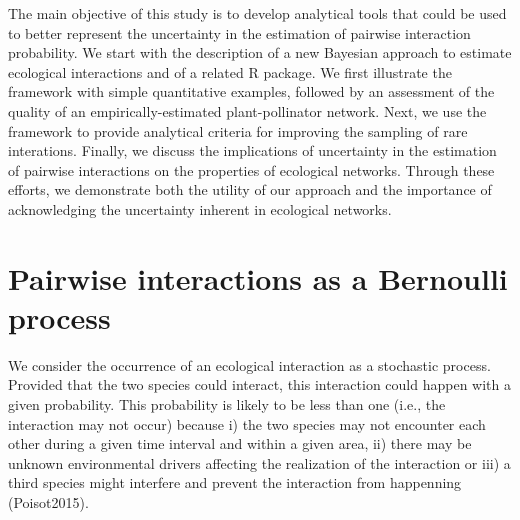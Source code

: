 \documentclass[12pt]{article}
\begin{document}
    The main objective of this study is to develop analytical tools that could be used to better represent the uncertainty in the estimation of pairwise interaction probability. We start with the description of a new Bayesian approach to estimate ecological interactions and of a related R package. We first illustrate the framework with simple quantitative examples, followed by an assessment of the quality of an empirically-estimated plant-pollinator network. Next, we use the framework to provide analytical criteria for improving the sampling of rare interations. Finally, we discuss the implications of uncertainty in the estimation of pairwise interactions on the properties of ecological networks. Through these efforts, we demonstrate both the utility of our approach and the importance of acknowledging the uncertainty inherent in ecological networks.






\section*{Pairwise interactions as a Bernoulli process}

    We consider the occurrence of an ecological interaction as a stochastic process. Provided that the two species could interact, this interaction could happen with a given probability. This probability is likely to be less than one (i.e., the interaction may not occur) because i) the two species may not encounter each other during a given time interval and within a given area, ii) there may be unknown environmental drivers affecting the realization of the interaction or iii) a third species might interfere and prevent the interaction from happenning (Poisot2015). 
\end{document}
